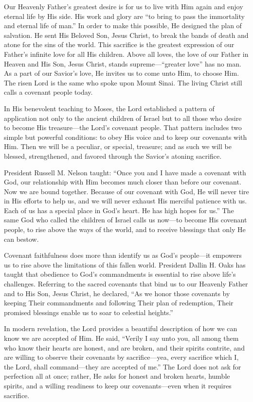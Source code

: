\documentclass[letterpaper, 11pt]{report}
\begin{document}
Our Heavenly Father’s greatest desire is for us to live with Him again and enjoy eternal life by His side. His work and glory are “to bring to pass the immortality and eternal life of man.” In order to make this possible, He designed the plan of salvation⁠. He sent His Beloved Son, Jesus Christ, to break the bands of death and atone for the sins of the world. This sacrifice is the greatest expression of our Father’s infinite love for all His children. Above all loves, the love of our Father in Heaven and His Son, Jesus Christ, stands supreme—“greater love” has no man. As a part of our Savior’s love, He invites us to come unto Him, to choose Him. The risen Lord is the same who spoke upon Mount Sinai. The living Christ still calls a covenant people today.

In His benevolent teaching to Moses, the Lord established a pattern of application not only to the ancient children of Israel but to all those who desire to become His treasure—the Lord’s covenant people. That pattern includes two simple but powerful conditions: to obey His voice and to keep our covenants with Him. Then we will be a peculiar, or special, treasure; and as such we will be blessed, strengthened, and favored through the Savior’s atoning sacrifice.

President Russell M. Nelson taught: “Once you and I have made a covenant with God, our relationship with Him becomes much closer than before our covenant. Now we are bound together. Because of our covenant with God, He will never tire in His efforts to help us, and we will never exhaust His merciful patience with us. Each of us has a special place in God’s heart. He has high hopes for us.” The same God who called the children of Israel calls us now—to become His covenant people, to rise above the ways of the world, and to receive blessings that only He can bestow.

Covenant faithfulness does more than identify us as God’s people—it empowers us to rise above the limitations of this fallen world. President Dallin H. Oaks has taught that obedience to God’s commandments is essential to rise above life’s challenges. Referring to the sacred covenants that bind us to our Heavenly Father and to His Son, Jesus Christ, he declared, “As we honor those covenants by keeping Their commandments and following Their plan of redemption, Their promised blessings enable us to soar to celestial heights.”

In modern revelation, the Lord provides a beautiful description of how we can know we are accepted of Him. He said, “Verily I say unto you, all among them who know their hearts are honest, and are broken, and their spirits contrite, and are willing to observe their covenants by sacrifice—yea, every sacrifice which I, the Lord, shall command—they are accepted of me.” The Lord does not ask for perfection all at once; rather, He asks for honest and broken hearts, humble spirits, and a willing readiness to keep our covenants—even when it requires sacrifice.
\end{document}
